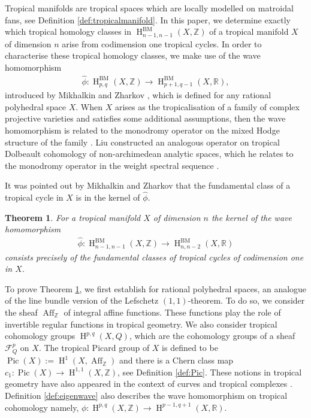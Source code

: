 \documentclass[11pt]{article}
\numberwithin{equation}{numsection}
\newcommand{\Z}{{\mathbb Z}}
\newcommand{\R}{{\mathbb R}}
\newcommand{\FS}{\mathcal{F}}
\newcommand{\phihat}{\hat{\phi}}
\DeclareMathOperator{\Pic}{Pic}
\DeclareMathOperator{\Aff}{Aff}
\DeclareMathOperator{\BM}{BM}
\DeclareMathOperator{\HH}{H}
\newtheorem{thm}{Theorem}[section]
\begin{document}
Tropical manifolds are tropical spaces which are locally modelled on matroidal fans, see Definition \ref{def:tropicalmanifold}.
In this paper, we determine exactly which tropical homology classes in $\HH^{\BM}_{n-1, n-1}(X, \Z)$ 
of a tropical manifold  $X$ of dimension $n$ arise from codimension one tropical cycles. 
 In order to characterise these tropical homology classes, we make use of the  wave homomorphism 
 \begin{align*}
\phihat \colon \HH^{\BM}_{p,q}(X, \Z) \to \HH^{\BM}_{p+1,q-1}(X, \R),
\end{align*}
introduced by Mikhalkin and Zharkov  \cite{MikZhar}, 
which is defined for any rational polyhedral space $X$.  
When $X$ arises as the tropicalisation of 
a family of complex projective varieties and satisfies some additional assumptions, then the wave homomorphism is related to
 the monodromy 
operator on the mixed Hodge structure of the family \cite[Section 7]{MikZhar}. 
 Liu constructed an analogous operator on tropical Dolbeault cohomology of non-archimedean analytic spaces, 
 which he relates to the monodromy operator in the weight spectral sequence \cite{Yifeng}.

It was pointed out by Mikhalkin and Zharkov that the  fundamental class of a tropical cycle in $X$ is in the kernel of $\phihat$.

\begin{thm} \label{Theorem III intro}
For a  tropical manifold $X$  of dimension $n$ the kernel of the wave homomorphism 
\begin{align*}
\phihat \colon \HH^{\BM}_{n-1, n-1}(X,  \mathbb{Z})  \to \HH^{\BM}_{n, n-2}(X, \R)
\end{align*}
consists precisely of the fundamental classes of  tropical cycles of codimension one in $X$. 
\end{thm}




To prove Theorem \ref{Theorem III intro}, we first establish for rational polyhedral spaces, an analogue of the line bundle version of the Lefschetz $(1, 1)$-theorem.
To do so, we consider the sheaf $\Aff_{\Z}$ of integral affine functions. These functions 
 play the role of invertible regular functions in tropical geometry.
We also consider tropical cohomology groups $\HH^{p,q}(X, Q)$, 
which are  the cohomology groups of a  sheaf  
$\FS^p_Q$ on $X$. 
The tropical Picard group of $X$ is defined to be $\Pic(X) := \HH^{1}(X, \Aff_ \Z)$ and 
there is a Chern class map  $c_1 \colon \Pic(X) \to \HH^{1, 1}(X, \Z)$, see Definition \ref{def:Pic}.
These notions in tropical geometry have also appeared in the context of curves \cite{MikZha:Theta} and tropical complexes \cite{Dustin, DustinSurfaces}. 
Definition \ref{def:eigenwave} also describes the wave homomorphism  on tropical cohomology namely, 
$\phi \colon \HH^{p, q}(X, \Z) \to \HH^{p-1, q+1}(X, \R)$.
\end{document}
